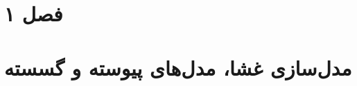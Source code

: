 \documentclass[a4paper,12pt]{book}
\begin{document}
\doublespacing
\cleardoublepage
{} 







\tableofcontents
\clearpage
\listoffigures

\def \Mempath {Chapters/Membrane}

\clearpage

\clearpage
{} 
\chapter{
}


\clearpage

\clearpage
\chapter{
}

\clearpage

\clearpage
\chapter{
}



\chapter{
}



%
\chapter{فصل ۱}

\clearpage
\chapter{
مدل‌سازی غشا، مدل‌های پیوسته و گسسته
}




\unsetRL
 



\end{document}

